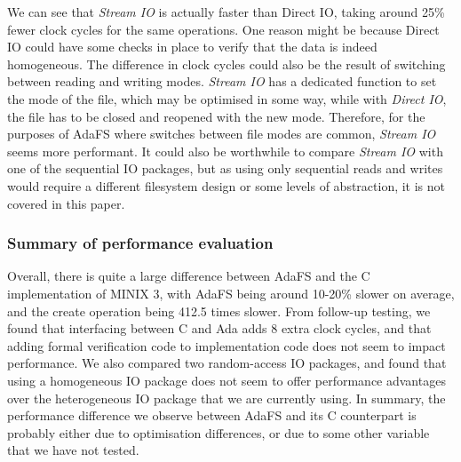 We can see that \textit{Stream IO} is actually faster than Direct IO, taking around 25\% fewer clock cycles for the same operations.
One reason might be because Direct IO could have some checks in place to verify that the data is indeed homogeneous.
The difference in clock cycles could also be the result of switching between reading and writing modes.
\textit{Stream IO} has a dedicated function to set the mode of the file, which may be optimised in some way, while with \textit{Direct IO}, the file has to be closed and reopened with the new mode.
Therefore, for the purposes of AdaFS where switches between file modes are common, \textit{Stream IO} seems more performant.
It could also be worthwhile to compare \textit{Stream IO} with one of the sequential IO packages, but as using only sequential reads and writes would require a different filesystem design or some levels of abstraction, it is not covered in this paper.

\subsubsection{Summary of performance evaluation}
Overall, there is quite a large difference between AdaFS and the C implementation of MINIX 3, with AdaFS being around 10-20\% slower on average, and the create operation being 412.5 times slower.
From follow-up testing, we found that interfacing between C and Ada adds 8 extra clock cycles, and that adding formal verification code to implementation code does not seem to impact performance.
We also compared two random-access IO packages, and found that using a homogeneous IO package does not seem to offer performance advantages over the heterogeneous IO package that we are currently using.
In summary, the performance difference we observe between AdaFS and its C counterpart is probably either due to optimisation differences, or due to some other variable that we have not tested.
